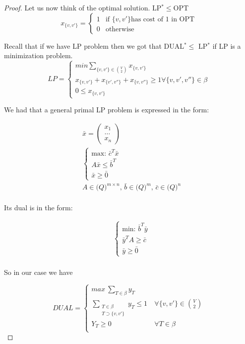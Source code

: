 \documentclass[]{article}
\begin{document}
\begin{proof}
	Let us now think of the optimal solution. LP$ ^* \leq $OPT
	\[	x_{\{v, v'\}} = 
	\begin{cases}
	1&\text{if } \{v, v'\} \text{has cost of 1 in OPT}\\
	0&\text{otherwise}
	\end{cases}
	\]
	
	Recall that if we have LP problem then we got that DUAL$ ^* \leq$ LP$ ^* $ if LP is a minimization problem.
	\[
	LP = 
		\begin{cases}
		min \sum_{\{v, v'\}\in {V\choose 2}}^{} x_{\{v, v'\}}\\
		x_{\{v, v'\}} + x_{\{v', v''\}} + x_{\{v, v''\}} \geq 1 \forall \{v, v', v''\}\in \beta \\
		0 \leq x_{\{v, v'\}}	
	\end{cases}
	\]
	
	We had that a general primal LP problem is expressed in the form:
	
	\begin{align*}
	&\bar{x} = \begin{pmatrix}
	x_1\\
	\dots \\
	x_n
	\end{pmatrix}\\
	&\begin{cases}
	\text{max: } \bar{c}^T \bar{x}\\
	A \bar{x} \leq \bar{b}^T\\
	\bar{x} \geq \bar{0}
	\end{cases}\\
	&A \in \mathscr(Q)^{m\times n},\, \bar{b} \in \mathscr(Q)^{m},\, \bar{c} \in \mathscr(Q)^{n}\\
	\end{align*}
	
	Its dual is in the form:
	
	\begin{align*}
	&\begin{cases}
	\text{min: } \bar{b}^T \bar{y}\\
	\bar{y}^T A \geq \bar{c}\\
	\bar{y} \geq \bar{0}
	\end{cases}\\
	\end{align*}
	
	So in our case we have
	
	\[
	DUAL = 
	\begin{cases}
	max\ \sum\limits_{T\in \beta}y_T\\
	\sum\limits_{\substack{T\in \beta\\T\supset \{v, v'\}}}y_T \leq 1\ &\forall \{v, v'\} \in {V \choose 2}\\
	Y_T \geq 0 &\forall T\in\beta\\
	\end{cases}
	\]
	

\end{proof}
\end{document}
